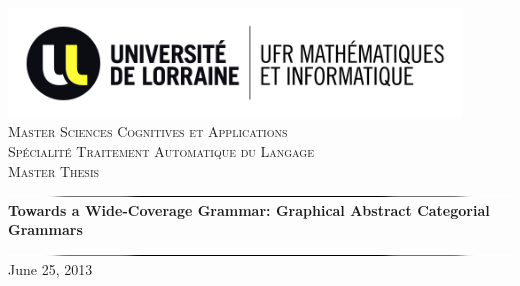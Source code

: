 \documentclass{report}
\begin{document}
\begin{titlepage}
\begin{center}

\newcommand{\HRule}{\includegraphics[width=\textwidth]{images/hrule.png}}

\includegraphics[width=0.9\textwidth]{images/UL_UFR_MI.jpg}\\[1.5cm]

\textsc{\LARGE Master Sciences Cognitives et Applications\\[0.5cm]Sp\'ecialit\'e Traitement Automatique du Langage}\\[1.5cm]

\textsc{\Large Master Thesis}\\[0.65cm]

\HRule \\[0.6cm]
{ \huge \bfseries Towards a Wide-Coverage Grammar: Graphical Abstract Categorial Grammars }\\[0.4cm]

\HRule \\[0.5cm]

June 25, 2013 \\[0.75cm]


\end{center}
\end{titlepage}
\end{document}
